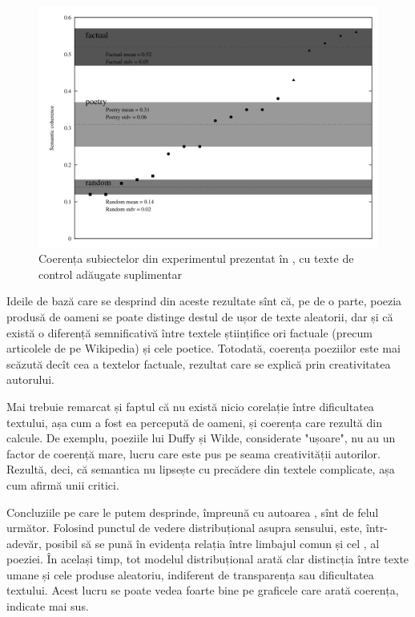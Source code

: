 \begin{figure}[!htb]
  \centering
  \includegraphics[scale=0.35]{img/coherence2.png}
  \caption{Coerența subiectelor din experimentul prezentat în \cite{herbelot},
  cu texte de control adăugate suplimentar}
  \label{fig:coerenta2}
\end{figure}

Ideile de bază care se desprind din aceste rezultate sînt că, pe de o parte,
poezia produsă de oameni se poate distinge destul de ușor de texte aleatorii,
dar și că există o diferență semnificativă între textele științifice ori
factuale (precum articolele de pe Wikipedia) și cele poetice. Totodată,
coerența poeziilor este mai scăzută decît cea a textelor factuale, rezultat
care se explică prin creativitatea autorului.

Mai trebuie remarcat și faptul că nu există nicio corelație între dificultatea
textului, așa cum a fost ea percepută de oameni, și coerența care rezultă
din calcule. De exemplu, poeziile lui Duffy și Wilde, considerate "ușoare",
nu au un factor de coerență mare, lucru care este pus pe seama creativității
autorilor. Rezultă, deci, că semantica nu lipsește cu precădere din textele
complicate, așa cum afirmă unii critici.

Concluziile pe care le putem desprinde, împreună cu autoarea \cite{herbelot},
sînt de felul următor. Folosind punctul de vedere distribuțional asupra
sensului, este, într-adevăr, posibil să se pună în evidența relația între
limbajul comun și cel , al poeziei. În același timp, tot
modelul distribuțional arată clar distincția între texte umane și cele
produse aleatoriu, indiferent de transparența sau dificultatea textului.
Acest lucru se poate vedea foarte bine pe graficele care arată coerența,
indicate mai sus.


